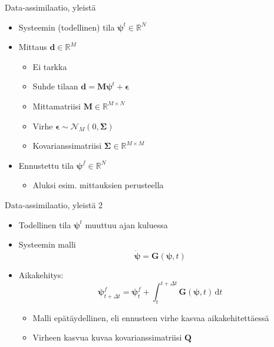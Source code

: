 \documentclass{beamer}
\begin{document}
\begin{frame}{Data-assimilaatio, yleistä}

\begin{itemize}
\item Systeemin (todellinen) tila $\boldsymbol{\psi}^t \in \mathbb{R}^N$
\item Mittaus $\boldsymbol{d} \in \mathbb{R}^M$
\begin{itemize}
\item Ei tarkka
\item Suhde tilaan $\boldsymbol{d} = \mathbf{M}\boldsymbol{\psi}^t+\boldsymbol{\epsilon}$
\item Mittamatriisi $\mathbf{M} \in \mathbb{R}^{M \times N}$
\item Virhe $\boldsymbol{\epsilon} \sim \mathcal{N}_M(0,\boldsymbol{\Sigma})$
\item Kovarianssimatriisi $\boldsymbol{\Sigma} \in \mathbb{R}^{M \times M}$
\end{itemize}
\item Ennustettu tila $\boldsymbol{\psi}^f \in \mathbb{R}^N$
\begin{itemize}
\item Aluksi esim. mittauksien perusteella
\end{itemize}
\end{itemize}

\end{frame}

\begin{frame}{Data-assimilaatio, yleistä 2}

\begin{itemize}
\item Todellinen tila $\boldsymbol{\psi}^t$ muuttuu ajan kuluessa
\item Systeemin malli
\[
\boldsymbol{\dot{\psi}} = \boldsymbol{G}(\boldsymbol{\psi},t)
\]
\item Aikakehitys:
\[
\boldsymbol{\psi}^f_{t+\Delta t} = \boldsymbol{\psi}^f_t + \int_{t}^{t+\Delta t} \! \boldsymbol{G}(\boldsymbol{\psi},t) \, \mathrm{d}t
\]
\begin{itemize}
\item Malli epätäydellinen, eli ennusteen virhe kasvaa aikakehitettäessä
\item Virheen kasvua kuvaa kovarianssimatriisi $\mathbf{Q}$
\end{itemize}
\end{itemize}

\end{frame}
\end{document}
